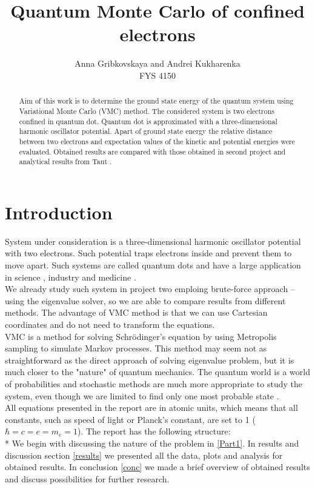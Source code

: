\documentclass[10pt]{article}
\begin{document}
\setlength\parindent{1pt}
\title{Quantum Monte Carlo of confined electrons }
\author{Anna Gribkovskaya and Andrei Kukharenka \\  
FYS 4150 
}

\maketitle
\begin{abstract}
Aim of this work is to determine the ground state energy of the quantum system using Variational Monte Carlo (VMC) method. The considered system is two electrons confined in quantum dot. Quantum dot is approximated with a three-dimensional harmonic oscillator potential. Apart of ground state energy the relative distance between two electrons and expectation values of the kinetic and potential energies were evaluated. Obtained results are compared with those obtained in second project\cite{proj2} and analytical results from Taut \cite{three}. 
\end{abstract}
\clearpage 


\section{Introduction}
System under consideration is a three-dimensional harmonic oscillator potential with two electrons. Such potential traps electrons inside and prevent them to move apart. Such systems are called quantum dots and have a large application in science \cite{four}, industry\cite{five} and medicine \cite{med}. \\
We already study such system in project two \cite{proj2} emploing brute-force approach -- using the eigenvalue solver, so we are able to compare results from different methods. The advantage of VMC method is that we can use Cartesian coordinates and do not need to transform the equations. \\ 
VMC is a method for solving Schr\"{o}dinger's equation by using Metropolis sampling to simulate Markov processes. This method may seem not as straightforward as the direct approach of solving eigenvalue problem, but it is much closer to the "nature" of quantum mechanics. The quantum world is a world of probabilities and stochastic methods are much more appropriate to study the system, even though we are limited to find only one most probable state \cite{one}. \\
All equations presented in the report are in atomic units, which means that all constants, such as speed of light or Planck's constant, are set to 1 ($\hbar=c=e=m_e=1$).
The report has the following structure:\\*
We begin with discussing the nature of the problem in \ref{Part1}.
In results and discussion section \ref{results} we presented all the data, plots and analysis for obtained results. 
In conclusion \ref{conc} we made a brief overview of obtained results and discuss possibilities for further research. 
\end{document}
